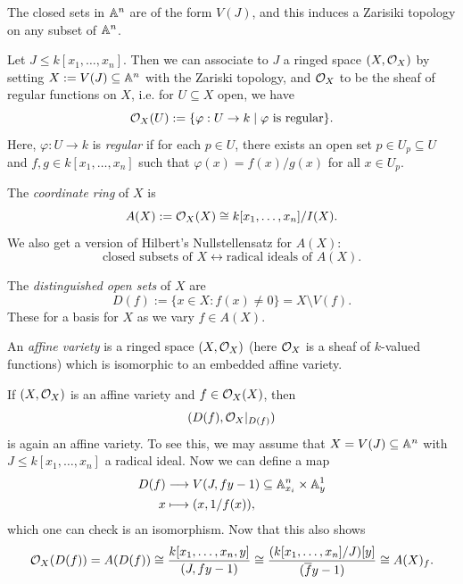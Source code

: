 \begin{remark}
  The closed sets in $\mathbb{A}^n$ are
  of the form $V(J)$, and this induces
  a Zarisiki topology on any subset
  of $\mathbb{A}^n$.
\end{remark}

\begin{remark}
  Let $J \le k[x_1, \dots, x_n]$.
  Then we can associate to $J$ a
  ringed space $(X, \mathcal{O}_X)$
  by setting $X := V(J) \subseteq \mathbb{A}^n$
  with the Zariski topology, and
  $\mathcal{O}_X$ to be the sheaf of regular functions on $X$, i.e.
  for $U \subseteq X$ open, we have
  \[
    \mathcal{O}_X(U)
    := \{
      \varphi : U \to k \mid
      \varphi \text{ is regular}
    \}.
  \]
  Here, $\varphi : U \to k$ is
  \emph{regular} if for each $p \in U$,
  there exists an open set
  $p \in U_p \subseteq U$ and
  $f, g \in k[x_1, \dots, x_n]$
  such that $\varphi(x) = f(x) / g(x)$
  for all $x \in U_p$.
\end{remark}

\begin{remark}
  The \emph{coordinate ring} of $X$ is
  \[
    A(X) :=
    \mathcal{O}_X(X)
    \cong k[x_1, \dots, x_n] / I(X).
  \]
  We also get a version of
  Hilbert's Nullstellensatz for
  $A(X)$:
  \[
    \text{closed subsets of $X$}
    \longleftrightarrow
    \text{radical ideals of $A(X)$}.
  \]
\end{remark}

\begin{remark}
  The \emph{distinguished open sets} of $X$
  are
  \[
    D(f)
    := \{x \in X : f(x) \ne 0\}
    = X \setminus V(f).
  \]
  These for a basis for $X$ as we vary
  $f \in A(X)$.
\end{remark}

\begin{definition}
  An \emph{affine variety} is a
  ringed space $(X, \mathcal{O}_X)$ (here
  $\mathcal{O}_X$ is a sheaf of $k$-valued
  functions) which is
  isomorphic to an embedded affine
  variety.
\end{definition}

\begin{example}
  If $(X, \mathcal{O}_X)$ is an affine variety
  and $f \in \mathcal{O}_X(X)$, then
  \[
    (D(f), \mathcal{O}_X|_{D(f)})
  \]
  is again an affine variety. To
  see this, we may assume that
  $X = V(J) \subseteq \mathbb{A}^n$
  with $J \le k[x_1, \dots, x_n]$
  a radical ideal. Now we can define
  a map
  \begin{align*}
    D(f) &\longrightarrow
    V(J, fy - 1) \subseteq \mathbb{A}^n_{x_i} \times \mathbb{A}^1_y \\
    x &\longmapsto (x, 1 / f(x)),
  \end{align*}
  which one can check is an isomorphism.
  Now that this also shows
  \[
    \mathcal{O}_X(D(f))
    = A(D(f))
    \cong \frac{k[x_1, \dots, x_n, y]}{(J, fy - 1)}
    \cong \frac{(k[x_1, \dots, x_n] / J)[y]}{(\overline{f} y - 1)}
    \cong A(X)_f.
  \]
\end{example}

